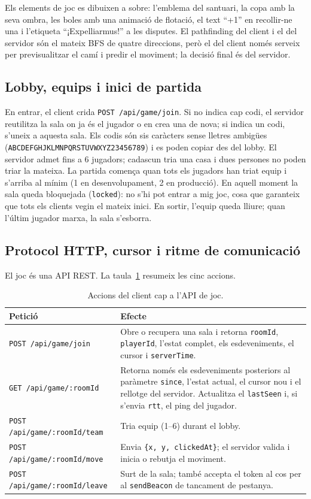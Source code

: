\documentclass[11pt,a4paper]{article}
\begin{document}
Els elements de joc es dibuixen a sobre: l'emblema del santuari, la copa amb la seva
ombra, les boles amb una animació de flotació, el text \enquote{+1} en recollir-ne una
i l'etiqueta \enquote{¡Expelliarmus!} a les disputes. El pathfinding del client i el del
servidor són el mateix BFS de quatre direccions, però el del client només serveix per
previsualitzar el camí i predir el moviment; la decisió final és del servidor.

\subsection{Lobby, equips i inici de partida}

En entrar, el client crida \texttt{POST /api/game/join}. Si no indica cap codi, el
servidor reutilitza la sala on ja és el jugador o en crea una de nova; si indica un
codi, s'uneix a aquesta sala. Els codis són sis caràcters sense lletres ambigües
(\texttt{ABCDEFGHJKLMNPQRSTUVWXYZ23456789}) i es poden copiar des del lobby. El
servidor admet fins a 6 jugadors; cadascun tria una casa i dues persones no poden triar
la mateixa. La partida comença quan tots els jugadors han triat equip i s'arriba al
mínim (1 en desenvolupament, 2 en producció). En aquell moment la sala queda
bloquejada (\texttt{locked}): no s'hi pot entrar a mig joc, cosa que garanteix que tots
els clients vegin el mateix inici. En sortir, l'equip queda lliure; quan l'últim
jugador marxa, la sala s'esborra.

\subsection{Protocol HTTP, cursor i ritme de comunicació}

El joc és una API REST. La taula~\ref{tab:api-joc} resumeix les cinc accions.

\begin{table}[ht]
\centering
\small
\begin{tabularx}{\textwidth}{@{}lX@{}}
\toprule
\textbf{Petició} & \textbf{Efecte} \\
\midrule
\texttt{POST /api/game/join} & Obre o recupera una sala i retorna
\texttt{roomId}, \texttt{playerId}, l'estat complet, els esdeveniments, el cursor i
\texttt{serverTime}. \\
\texttt{GET /api/game/:roomId} & Retorna només els esdeveniments posteriors al
paràmetre \texttt{since}, l'estat actual, el cursor nou i el rellotge del servidor.
Actualitza el \texttt{lastSeen} i, si s'envia \texttt{rtt}, el ping del jugador. \\
\texttt{POST /api/game/:roomId/team} & Tria equip (1--6) durant el lobby. \\
\texttt{POST /api/game/:roomId/move} & Envia \texttt{\{x, y, clickedAt\}}; el servidor
valida i inicia o rebutja el moviment. \\
\texttt{POST /api/game/:roomId/leave} & Surt de la sala; també accepta el token al cos
per al \texttt{sendBeacon} de tancament de pestanya. \\
\bottomrule
\end{tabularx}
\caption{Accions del client cap a l'API de joc.}
\label{tab:api-joc}
\end{table}
\end{document}
